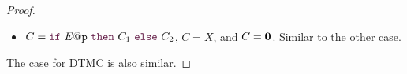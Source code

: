 \begin{proof}
\begin{itemize}
  \item $C=\ifTE {E}{p}{C_1}{C_2}$, $C=X$, and $C=\mathbf{0}$. Similar to
      the other case.
  \end{itemize}


  The case for DTMC is also similar.







\end{proof}

